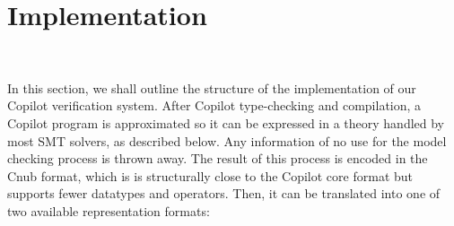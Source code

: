 \section{Implementation}~\label{sec:structure} 

%
%


In this section, we shall outline the structure of the implementation
of our Copilot verification system.   %
After Copilot type-checking and compilation, a Copilot program is approximated
so it can be expressed in a theory handled by most SMT solvers, as described below. Any information
of no use for the model checking process is thrown away. The result of this
process is encoded in the Cnub format, which is is structurally close to the
Copilot core format but supports fewer datatypes and operators. Then, it can be
translated into one of two available representation formats:

